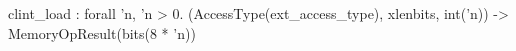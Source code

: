 clint_load : forall 'n, 'n > 0. (AccessType(ext_access_type), xlenbits, int('n)) -> MemoryOpResult(bits(8 * 'n))
